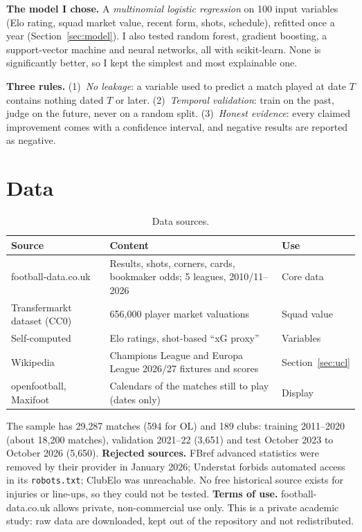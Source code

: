 \documentclass[11pt,a4paper]{article}
\theoremstyle{definition}
\theoremstyle{remark}
\begin{document}
\textbf{The model I chose.} A \emph{multinomial logistic regression} on 100 input variables (Elo rating, squad market value, recent form, shots, schedule),
refitted once a year (Section~\ref{sec:model}). I also tested random forest, gradient boosting, a support-vector machine and neural networks, all with scikit-learn.
None is significantly better, so I kept the simplest and most explainable one.

\textbf{Three rules.} (1)~\emph{No leakage}: a variable used to predict a match played at date $T$ contains nothing dated $T$ or later.
(2)~\emph{Temporal validation}: train on the past, judge on the future, never on a random split.
(3)~\emph{Honest evidence}: every claimed improvement comes with a confidence interval, and negative results are reported as negative.

\section{Data}

\begin{table}[H]
\caption{Data sources.}
\begin{center}
\small
\begin{tabular}{p{3.6cm}p{8.2cm}l}
\toprule
\textbf{Source} & \textbf{Content} & \textbf{Use} \\
\midrule
football-data.co.uk & Results, shots, corners, cards, bookmaker odds; 5 leagues, 2010/11--2026 & Core data \\
Transfermarkt dataset (CC0) & 656{,}000 player market valuations & Squad value \\
Self-computed & Elo ratings, shot-based ``xG proxy'' & Variables \\
Wikipedia & Champions League and Europa League 2026/27 fixtures and scores & Section~\ref{sec:ucl} \\
openfootball, Maxifoot & Calendars of the matches still to play (dates only) & Display \\
\bottomrule
\end{tabular}
\end{center}
\end{table}

The sample has 29{,}287 matches (594 for OL) and 189 clubs: training 2011--2020 (about 18{,}200 matches), validation 2021--22 (3{,}651) and test October 2023 to October 2026 (5{,}650).
\textbf{Rejected sources.} FBref advanced statistics were removed by their provider in January 2026; Understat forbids automated access in its \texttt{robots.txt}; ClubElo was unreachable.
No free historical source exists for injuries or line-ups, so they could not be tested.
\textbf{Terms of use.} football-data.co.uk allows private, non-commercial use only. This is a private academic study: raw data are downloaded, kept out of the repository and not redistributed.
\end{document}

